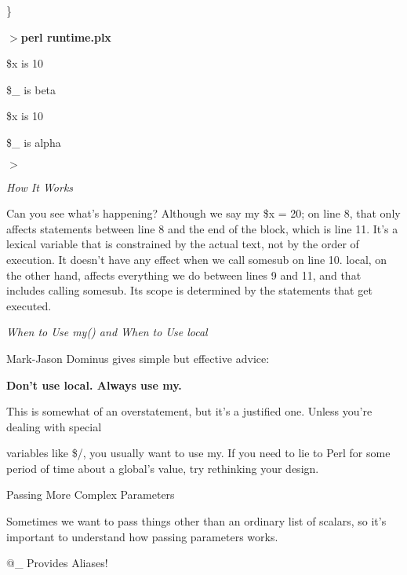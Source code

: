 \documentclass[a4paper,11pt]{book}
\begin{document}
\noindent \}

\noindent 

\noindent $>$\textbf{perl runtime.plx}

\noindent \$x is 10

\noindent \$\_ is beta

\noindent \$x is 10

\noindent \$\_ is alpha

\noindent $>$

\noindent 

\noindent 

\noindent \textit{How It Works}

\noindent Can you see what's happening? Although we say my \$x = 20; on line 8, that only affects statements between line 8 and the end of the block, which is line 11. It's a lexical variable that is constrained by the actual text, not by the order of execution. It doesn't have any effect when we call somesub on line 10. local, on the other hand, affects everything we do between lines 9 and 11, and that includes calling somesub. Its scope is determined by the statements that get executed.

\noindent 

\noindent \textit{When to Use my() and When to Use local}

\noindent Mark-Jason Dominus gives simple but effective advice:

\noindent 

\noindent 

\noindent \textbf{Don't use local. Always use my.}

\noindent 

\noindent 

\noindent This is somewhat of an overstatement, but it's a justified one. Unless you're dealing with special

\noindent variables like \$/, you usually want to use my. If you need to lie to Perl for some period of time about a global's value, try rethinking your design.

\noindent 

\noindent 

\noindent Passing More Complex Parameters

\noindent 

\noindent Sometimes we want to pass things other than an ordinary list of scalars, so it's important to understand how passing parameters works.

\noindent 

\noindent @\_ Provides Aliases!
\end{document}

